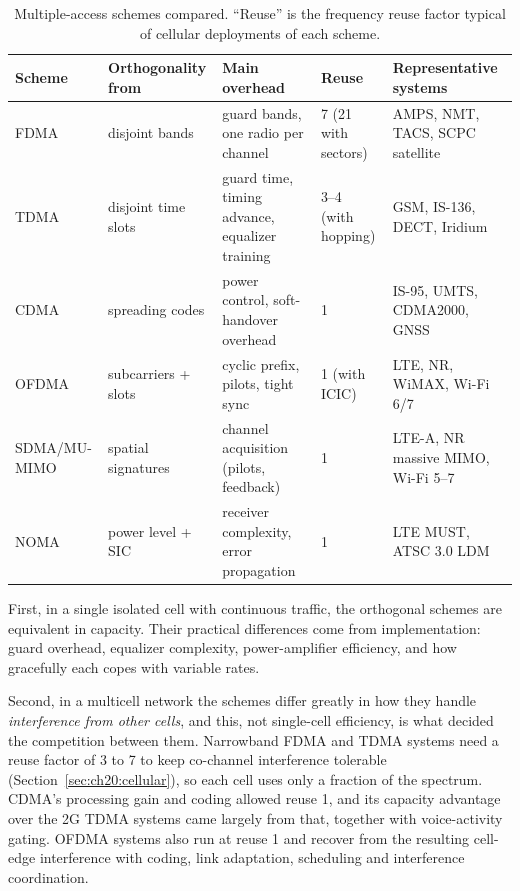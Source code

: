 \begin{table}[htbp]\centering\small
\caption{Multiple-access schemes compared. ``Reuse'' is the frequency reuse factor typical of cellular
deployments of each scheme.}
\label{tab:ch20:schemes}
\begin{tabularx}{\linewidth}{@{}l X X l X@{}}
\toprule
Scheme & Orthogonality from & Main overhead & Reuse & Representative systems\\
\midrule
FDMA & disjoint bands & guard bands, one radio per channel & 7 (21 with sectors) & AMPS, NMT, TACS, SCPC satellite\\
TDMA & disjoint time slots & guard time, timing advance, equalizer training & 3--4 (with hopping) & GSM, IS-136, DECT, Iridium\\
CDMA & spreading codes & power control, soft-handover overhead & 1 & IS-95, UMTS, CDMA2000, GNSS\\
OFDMA & subcarriers + slots & cyclic prefix, pilots, tight sync & 1 (with ICIC) & LTE, NR, WiMAX, Wi-Fi 6/7\\
SDMA/MU-MIMO & spatial signatures & channel acquisition (pilots, feedback) & 1 & LTE-A, NR massive MIMO, Wi-Fi 5--7\\
NOMA & power level + SIC & receiver complexity, error propagation & 1 & LTE MUST, ATSC 3.0 LDM\\
\bottomrule
\end{tabularx}
\end{table}

First, in a single isolated cell with continuous traffic, the orthogonal schemes are equivalent in
capacity. Their practical differences come from implementation: guard overhead, equalizer
complexity, power-amplifier efficiency, and how gracefully each copes with variable rates.

Second, in a multicell network the schemes differ greatly in how they handle \emph{interference from
other cells}, and this, not single-cell efficiency, is what decided the competition between them.
Narrowband FDMA and TDMA systems need a reuse factor of 3 to 7 to keep co-channel interference
tolerable (Section~\ref{sec:ch20:cellular}), so each cell uses only a fraction of the spectrum. CDMA's
processing gain and coding allowed reuse 1, and its capacity advantage over the 2G TDMA systems came
largely from that, together with voice-activity gating. OFDMA systems also run at reuse 1 and recover
from the resulting cell-edge interference with coding, link adaptation, scheduling and interference
coordination.

